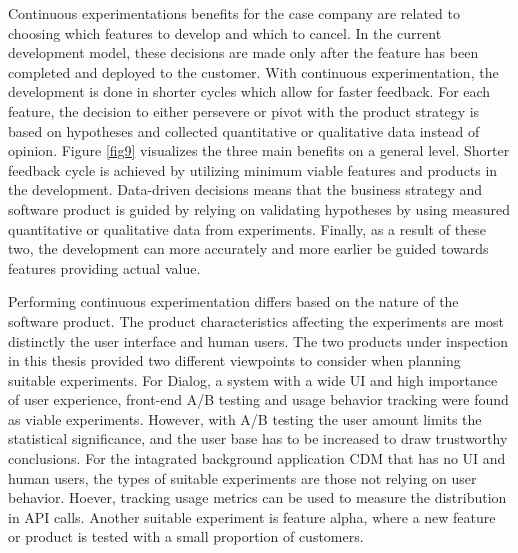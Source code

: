 \documentclass[english, grading]{tktltiki2}
\theoremstyle{definition}
\theoremstyle{remark}
\begin{document}


Continuous experimentations benefits for the case company are related to choosing which features to develop and which to cancel. In the current development model, these decisions are made only after the feature has been completed and deployed to the customer. With continuous experimentation, the development is done in shorter cycles which allow for faster feedback. For each feature, the decision to either persevere or pivot with the product strategy is based on hypotheses and collected quantitative or qualitative data instead of opinion. Figure \ref{fig9} visualizes the three main benefits on a general level. Shorter feedback cycle is achieved by utilizing minimum viable features and products in the development. Data-driven decisions means that the business strategy and software product is guided by relying on validating hypotheses by using measured quantitative or qualitative data from experiments. Finally, as a result of these two, the development can more accurately and more earlier be guided towards features providing actual value.


Performing continuous experimentation differs based on the nature of the software product. The product characteristics affecting the experiments are most distinctly the user interface and human users. The two products under inspection in this thesis provided two different viewpoints to consider when planning suitable experiments. For Dialog, a system with a wide UI and high importance of user experience, front-end A/B testing and usage behavior tracking were found as viable experiments. However, with A/B testing the user amount limits the statistical significance, and the user base has to be increased to draw trustworthy conclusions. For the intagrated background application CDM that has no UI and human users, the types of suitable experiments are those not relying on user behavior. Hoever, tracking usage metrics can be used to measure the distribution in API calls. Another suitable experiment is feature alpha, where a new feature or product is tested with a small proportion of customers.
\end{document}
